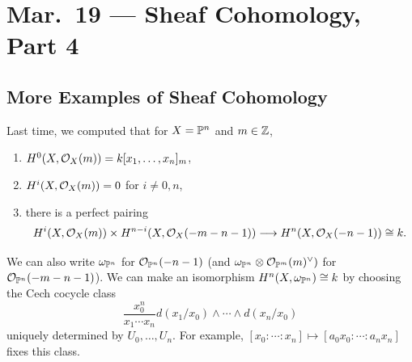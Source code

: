\chapter{Mar.~19 --- Sheaf Cohomology, Part 4}

\section{More Examples of Sheaf Cohomology}

\begin{remark}
  Last time, we computed that for
  $X = \mathbb{P}^n$ and $m \in \mathbb{Z}$,
  \begin{enumerate}
    \item $H^0(X, \mathcal{O}_X(m)) = k[x_1, \dots, x_n]_m$,
    \item $H^i(X, \mathcal{O}_X(m)) = 0$ for
      $i \ne 0, n$,
    \item there is a perfect pairing
      \[H^i(X, \mathcal{O}_X(m)) \times H^{n - i}(X, \mathcal{O}_X(-m - n - 1)) \longrightarrow H^n(X, \mathcal{O}_X(-n - 1)) \cong k.\]
  \end{enumerate}
  We can also write
  $\omega_{\mathbb{P}^n}$ for $\mathcal{O}_{\mathbb{P}^n}(-n - 1)$
  (and $\omega_{\mathbb{P}^n} \otimes \mathcal{O}_{\mathbb{P}^m}(m)^\vee)$
  for $\mathcal{O}_{\mathbb{P}^n}(-m - n - 1)$). We can make an
  isomorphism
  $H^n(X, \omega_{\mathbb{P}^n}) \cong k$ by choosing
  the Cech cocycle class
  \[
    \frac{x_0^n}{x_1 \cdots x_n}
    d(x_1 / x_0) \wedge \cdots \wedge d(x_n / x_0)
  \]
  uniquely determined by $U_0, \dots, U_n$.
  For example, $[x_0 : \cdots : x_n] \mapsto [a_0 x_0 : \cdots : a_n x_n]$
  fixes this class.
\end{remark}

